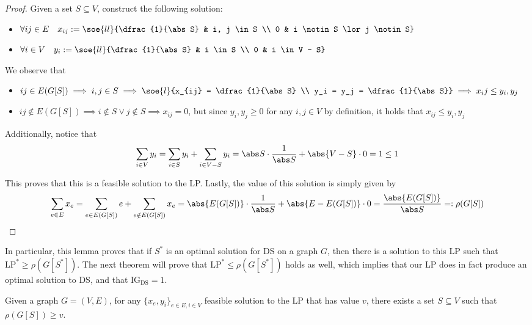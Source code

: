 \documentclass[a4paper, 12pt]{report}
\begin{document}
    \begin{proof}
        Given a set $S \subseteq V$, construct the following solution:

        \begin{itemize}
            \item $\forall ij \in E \quad x_{ij} := \soe{ll}{\dfrac{1}{\abs S} & i, j \in S \\ 0 & i \notin S \lor j \notin S}$
            \item $\forall i \in V \quad y_i := \soe{ll}{\dfrac{1}{\abs S} & i \in S \\ 0 & i \in V - S}$
        \end{itemize}

        We observe that

        \begin{itemize}
            \item $ij \in E(G[S]) \implies i, j \in S \implies \soe{l}{x_{ij} = \dfrac{1}{\abs S} \\ y_i = y_j = \dfrac{1}{\abs S}} \implies x_ij \le y_i, y_j$
            \item $ij \notin E(G[S]) \implies i \notin S \lor j \notin S \implies x_{ij} = 0$, but since $y_i, y_j \ge 0$ for any $i, j \in V$ by definition, it holds that $x_{ij} \le y_i, y_j$
        \end{itemize}

        Additionally, notice that $$\sum_{i \in V}{y_i} = \sum_{i \in S}{y_i} + \sum_{i \in V - S}{y_i} = \abs S \cdot \dfrac{1}{\abs S} + \abs {V - S} \cdot 0 = 1 \le 1$$

        This proves that this is a feasible solution to the LP. Lastly, the value of this solution is simply given by $$\sum_{e \in E}{x_e} = \sum_{e \in E(G[S])}{e} + \sum_{e \notin E(G[S])}{x_e} = \abs{E(G[S])} \cdot \dfrac{1}{\abs S} + \abs{E - E(G [S])} \cdot 0 = \dfrac{\abs{E(G[S])}}{\abs S} =: \rho(G[S])$$
    \end{proof}

    In particular, this lemma proves that if $S^*$ is an optimal solution for DS on a graph $G$, then there is a solution to this LP such that $\mathrm{LP^*} \ge \rho(G[S^*])$. The next theorem will prove that $\mathrm{LP^*} \le \rho(G[S^*])$ holds as well, which implies that our LP does in fact produce an optimal solution to DS, and that $\mathrm{IG_{DS}} = 1$.

    \begin{framedthm}{}
        Given a graph $G = (V, E)$, for any $\{x_e, y_i\}_{e \in E, i \in V}$ feasible solution to the LP that has value $v$, there exists a set $S \subseteq V$ such that $\rho(G[S]) \ge v$.
    \end{framedthm}
\end{document}
